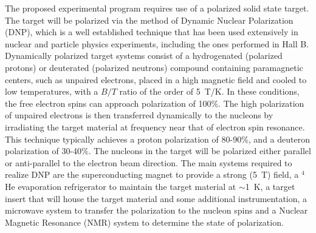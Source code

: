 The proposed experimental program requires use of a polarized solid state 
target.  The target will be polarized via the method of Dynamic Nuclear 
Polarization (DNP), which is a well established technique that has been 
used extensively in nuclear and particle physics experiments, including 
the ones performed in Hall B.  Dynamically polarized target systems 
consist of a hydrogenated (polarized protons) or deuterated (polarized 
neutrons) compound containing paramagnetic centers, such as unpaired 
electrons, placed in a high magnetic field and cooled to low temperatures, 
with a $B/T$ ratio of the order of 5~T/K.  In these conditions, the free 
electron spins can approach polarization of 100\%. The high polarization 
of unpaired electrons is then transferred dynamically to the nucleons by 
irradiating the target material at frequency near that of electron spin 
resonance. This technique typically achieves a proton polarization of 
80-90\%, and a deuteron polarization of 30-40\%.  The nucleons in the 
target will be polarized either parallel or anti-parallel to the electron 
beam direction.  The main systems required to realize DNP are the 
superconducting magnet to provide a strong (5~T) field, a $^4$He 
evaporation refrigerator to maintain the target material at $\sim$1~K, 
a target insert that will house the target material and some additional 
instrumentation, a microwave system to transfer the polarization to the 
nucleon spins and a Nuclear Magnetic Resonance (NMR) system to determine 
the state of polarization.
